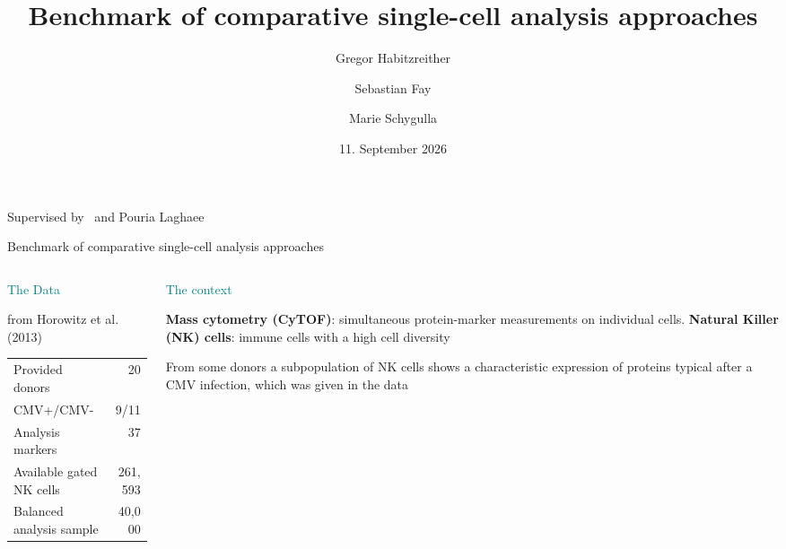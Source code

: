 \documentclass[aspectratio=169,10pt]{beamer}
\title{Benchmark of comparative single-cell analysis approaches}
\author{Gregor Habitzreither \and Sebastian Fay  \and Marie Schygulla}
\date{11. September 2026}
\begin{document}
\begin{frame}[plain]
  \begin{center}
    \vspace{6mm}
    {\LARGE\bfseries\inserttitle}\par
    \vspace{2mm}
    \ifx\insertsubtitle\@empty\else
      {\large\insertsubtitle}\par
      \vspace{8mm}
    \fi
    {\large\insertauthor}\par
    \vspace{8mm}
    {\normalsize\myseminar}\par
    {\normalsize Supervised by \mysupervisor ~and Pouria Laghaee}\par
    \vspace{6mm}
    {\normalsize\insertdate}
  \end{center}
\end{frame}

\begin{frame}{Benchmark of comparative single-cell analysis approaches}
  \begin{columns}[T,onlytextwidth]
  \begin{column}{.45\textwidth}
    \textcolor{Teal}{\large The Data}\par\medskip
    from Horowitz et al. (2013)
    \par\medskip
    \begin{tabular}{lr}\toprule
      Provided donors & 20\\
      CMV+/CMV- & 9/11\\
      Analysis markers & 37\\
      Available gated NK cells & 261,593\\
      Balanced analysis sample & 40,000\\\bottomrule
    \end{tabular}
  \end{column}
  \begin{column}{.42\textwidth}
    \textcolor{Teal}{\large The context}\par\medskip
    \textbf{Mass cytometry (CyTOF)}: simultaneous protein-marker measurements on individual cells.
    \textbf{Natural Killer (NK) cells}: immune cells with a high cell diversity
    \par\medskip
    From some donors a subpopulation of NK cells shows a characteristic expression of proteins typical after a CMV infection, which was given in the data
    \par\medskip
  \end{column}
  \end{columns}
\end{frame}
\end{document}
